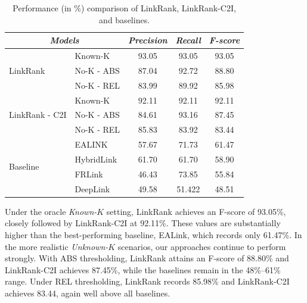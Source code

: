 \begin{table}[htbp]
\centering
\caption{Performance (in \%) comparison of LinkRank, LinkRank-C2I, and baselines. }
\renewcommand{\arraystretch}{1.2}
\label{rq3}
\scriptsize
\begin{tabular}{llccc}
\toprule
\multicolumn{2}{c}{\textit{\textbf{Models}}} & \textit{\textbf{Precision}} & \textit{\textbf{Recall}} & \textit{\textbf{F-score}} \\
\midrule

\multirow{3}{*}{LinkRank} 
 & Known-K     & 93.05 & 93.05 & 93.05 \\
 & No-K - ABS  & 87.04 & 92.72 & 88.80 \\
 & No-K - REL  & 83.99 & 89.92 & 85.98 \\
\midrule

\multirow{3}{*}{LinkRank - C2I} 
 & Known-K     & 92.11 & 92.11 & 92.11 \\
 & No-K - ABS  & 84.61 & 93.16 & 87.45 \\
 & No-K - REL  & 85.83 & 83.92 & 83.44 \\
\midrule



\multirow{4}{*}{Baseline} 
 & EALINK\cite{ealink}     & 57.67 & 71.73 & 61.47 \\
 & HybridLink\cite{q2}  & 61.70 & 61.70 & 58.90 \\
 & FRLink\cite{r56}      & 46.43 & 73.85 & 55.84 \\
 & DeepLink\cite{q1}   & 49.58 & 51.422 & 48.51 \\
\bottomrule
\end{tabular}
\end{table}

Under the oracle \textit{Known-$K$} setting, LinkRank achieves an F-score of 93.05\%, closely followed by LinkRank-C2I at 92.11\%. These values are substantially higher than the best-performing baseline, EALink, which records only 61.47\%. In the more realistic \textit{Unknown-$K$} scenarios, our approaches continue to perform strongly. With ABS thresholding, LinkRank attains an F-score of 88.80\% and LinkRank-C2I achieves 87.45\%, while the baselines remain in the 48\%--61\% range. Under REL thresholding, LinkRank records 85.98\% and LinkRank-C2I achieves 83.44, again well above all baselines.\\

